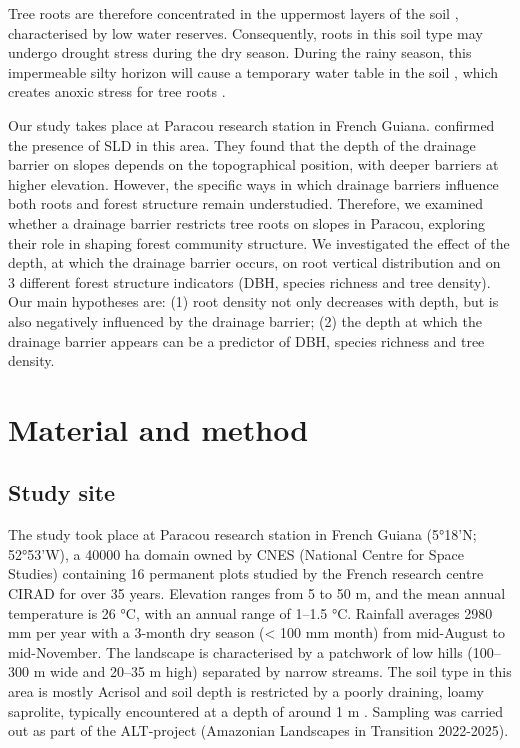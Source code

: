 \documentclass[fleqn,11pt]{latex/stylish_article} %
\begin{document}
Tree roots are therefore concentrated in the uppermost layers of the soil \citep{humbelCaracterisationParMesures1978}, characterised by low water reserves. Consequently, roots in this soil type may undergo drought stress during the dry season. During the rainy season, this impermeable silty horizon will cause a temporary water table in the soil \citep{humbelCaracterisationParMesures1978, pelissierWithinplotRelationshipsTree2002}, which creates anoxic stress for tree roots \citep{sabatierInfluenceSoilCover1997}.

Our study takes place at Paracou research station in French Guiana. \citet{epronSpatialVariationSoil2006} confirmed the presence of SLD in this area. They found that the depth of the drainage barrier on slopes depends on the topographical position, with deeper barriers at higher elevation. However, the specific ways in which drainage barriers influence both roots and forest structure remain understudied. Therefore, we examined whether a drainage barrier restricts tree roots on slopes in Paracou, exploring their role in shaping forest community structure. We investigated the effect of the depth, at which the drainage barrier occurs, on root vertical distribution and on 3 different forest structure indicators (DBH, species richness and tree density). Our main hypotheses are: (1) root density not only decreases with depth, but is also negatively influenced by the drainage barrier; (2) the depth at which the drainage barrier appears can be a predictor of DBH, species richness and tree density.

\hypertarget{material-and-method}{%
\section{Material and method}\label{material-and-method}}

\hypertarget{study-site}{%
\subsection{Study site}\label{study-site}}

The study took place at Paracou research station in French Guiana (5°18'N; 52°53'W), a 40000 ha domain owned by CNES (National Centre for Space Studies) containing 16 permanent plots studied by the French research centre CIRAD for over 35 years. Elevation ranges from 5 to 50 m, and the mean annual temperature is 26 °C, with an annual range of 1--1.5 °C. Rainfall averages 2980 mm per year with a 3-month dry season (\textless{} 100 mm month) from mid-August to mid-November. The landscape is characterised by a patchwork of low hills (100--300 m wide and 20--35 m high) separated by narrow streams. The soil type in this area is mostly Acrisol \citep{iussworkinggroupwrbWorldReferenceBase2022} and soil depth is restricted by a poorly draining, loamy saprolite, typically encountered at a depth of around 1 m \citep{epronSpatialVariationSoil2006}. Sampling was carried out as part of the ALT-project (Amazonian Landscapes in Transition 2022-2025).
\end{document}
